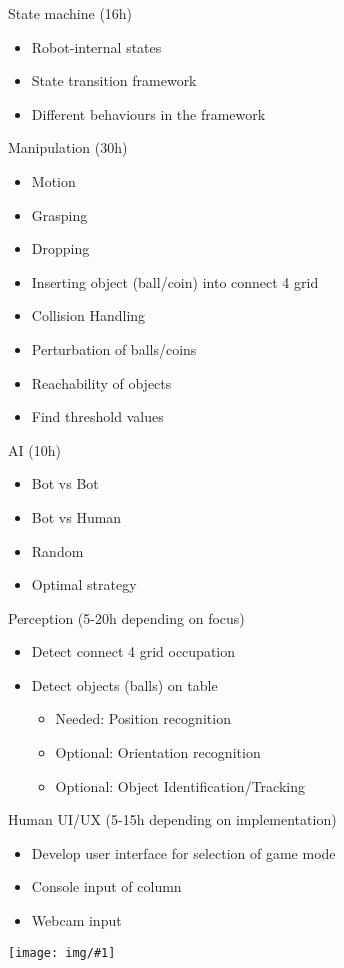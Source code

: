 \documentclass[11pt,pdftex,a4paper]{article}
\newcommand{\image}[1]{


\begin{center}
	\texttt{[image: img/\#1]}
\end{center}
}
\begin{document}
	\noindent
	State machine (16h)
	\begin{itemize}
	\item Robot-internal states
	\item State transition framework
	\item Different behaviours in the framework
	\end{itemize}
	
	\noindent
	Manipulation (30h)
	\begin{itemize}
	\item Motion
	\item Grasping
	\item Dropping
	\item Inserting object (ball/coin) into connect 4 grid
	\item Collision Handling
	\item Perturbation of balls/coins
	\item Reachability of objects
	\item Find threshold values	
	\end{itemize}
	
	\noindent
	AI (10h)
	\begin{itemize}
	\item Bot vs Bot
	\item Bot vs Human
	\item Random
	\item Optimal strategy	
	\end{itemize}
	
	\pagebreak\noindent
	Perception (5-20h depending on focus) 
	\begin{itemize}
	\item Detect connect 4 grid occupation
	\item Detect objects (balls) on table
		\begin{itemize}
		\item Needed: Position recognition
		\item Optional: Orientation recognition
		\item Optional: Object Identification/Tracking	
		\end{itemize}
	\end{itemize}
	
	\noindent
	Human UI/UX (5-15h depending on implementation)
	\begin{itemize}
	\item Develop user interface for selection of game mode
	\item Console input of column
	\item Webcam input
	\end{itemize}
	
	\image{Connect-4-concept}
	
\end{document}
